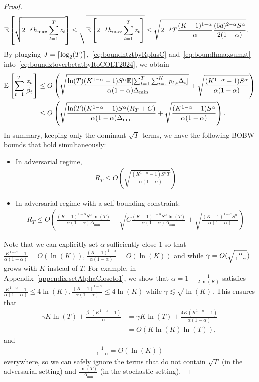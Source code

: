 \begin{proof}
\begin{align}
    \mathbb{E}\left[ \sqrt{2^{-J}h_{\max}\sum_{t=1}^T z_t} \right] &\leq \sqrt{\mathbb{E}\left[ {2^{-J}h_{\max}\sum_{t=1}^T z_t} \right] } \leq \sqrt{2^{-J}T\frac{(K-1)^{1-\alpha}}{\alpha}\frac{(6d)^{2-\alpha}S^{\alpha}}{2(1-\alpha)}}.
    \label{eq:boundhmaxsumzt}
\end{align}
By plugging $J = \lceil \log_2(T) \rceil$,~\eqref{eq:boundhtztbyRplusC} and~\eqref{eq:boundhmaxsumzt} into~\eqref{eq:boundztoverbetatbyItoCOLT2024}, we obtain
\begin{align*}
    \mathbb{E}\left[\sum_{t=1}^T \frac{z_t}{\beta_t}\right] &\leq O\left( \sqrt{\frac{\ln(T)(K^{1-\alpha}-1)S^{\alpha}\mathbb{E}[\sum_{t=1}^T \sum_{i=1}^K p_{t,i}\Delta_i]}{\alpha(1-\alpha)\Delta_{\min}}} + \sqrt{\frac{(K^{1-\alpha} - 1)S^{\alpha}}{\alpha(1-\alpha)}} \right) \\
    &\leq  O\left( \sqrt{\frac{\ln(T)(K^{1-\alpha}-1)S^{\alpha}(R_T + C)}{\alpha(1-\alpha)\Delta_{\min}}} + \sqrt{\frac{(K^{1-\alpha} - 1)S^{\alpha}}{\alpha(1-\alpha)}} \right).
\end{align*}
In summary, keeping only the dominant $\sqrt{T}$ terms, we have the following BOBW bounds that hold simultaneously:
\begin{itemize}
    \item In adversarial regime,
    \begin{align*}
        R_T \leq O\left(\sqrt{\frac{(K^{1-\alpha} - 1)S^\alpha T}{\alpha(1-\alpha)}}\right)
    \end{align*}
    \item In adversarial regime with a self-bounding constraint:
    \begin{align*}
        R_T \leq O\left(\frac{(K-1)^{1-\alpha}S^\alpha \ln(T)}{\alpha(1-\alpha)\Delta_{\min}} + \sqrt{C\frac{(K-1)^{1-\alpha}S^\alpha \ln(T)}{\alpha(1-\alpha)\Delta_{\min}}} + \sqrt{\frac{(K-1)^{1-\alpha}S^{\alpha}}{\alpha(1-\alpha)}}\right)
    \end{align*}
\end{itemize}

Note that we can explicitly set $\alpha$ sufficiently close $1$ so that $\frac{K^{1-\alpha}-1}{\alpha(1-\alpha)} = O(\ln(K)), \frac{(K-1)^{1-\alpha}}{\alpha(1-\alpha)} = O(\ln(K))$ and while $\gamma = O(\sqrt{\frac{\alpha}{1-\alpha}})$ grows with $K$ instead of $T$. For example, in Appendix~\ref{appendix:setAlphaCloseto1}, we show that $\alpha = 1 - \frac{1}{2\ln(K)}$ satisfies $\frac{K^{1-\alpha}-1}{\alpha(1-\alpha)} \leq 4\ln(K), \frac{(K-1)^{1-\alpha}}{\alpha (1-\alpha)} \leq 4\ln(K)$ while $\gamma \lesssim \sqrt{\ln(K)}$.
This ensures that 
\begin{align*}
    \gamma K\ln(T) + \frac{\beta_1 (K^{1-\alpha} - 1)}{\alpha} &= \gamma K\ln(T) + \frac{4K (K^{1-\alpha} - 1)}{\alpha (1-\alpha)} \\
    &= O\left(K\ln(K)\ln(T)\right),
\end{align*}
and
\begin{align*}
    \frac{1}{1-\alpha} = O(\ln(K))
\end{align*}
everywhere, so we can safely ignore the terms that do not contain $\sqrt{T}$ (in the adversarial setting) and $\frac{\ln(T)}{\Delta_{\min}}$ (in the stochastic setting).


\end{proof}
